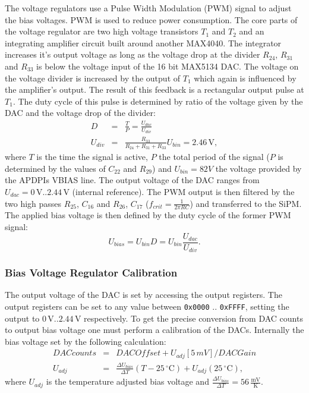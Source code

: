 \documentclass[]{article}
\begin{document}
The voltage regulators use a Pulse Width Modulation (PWM) signal to adjust the bias voltages. PWM is used to reduce power consumption.
The core parts of the voltage regulator are two high voltage transistors $T_1$ and $T_2$ and an integrating amplifier circuit built around another MAX4040. The integrator increases
it's output voltage as long as the voltage drop at the divider $R_{24}$, $R_{31}$ and $R_{33}$ is below the voltage input of the 16 bit MAX5134 DAC.
The voltage on the voltage divider is increased by the output of $T_1$ which again is influenced by the amplifier's output. The result of this feedback is a rectangular output
pulse at $T_1$. The duty cycle of this pulse is determined by ratio of the voltage given by the DAC and the voltage drop of the divider:
	\begin{eqnarray}
		D &=& \frac{T}{P} = \frac{U_{dac}}{U_{div}} \\
		U_{div} &=& \frac{R_{33}}{R_{24} + R_{31} + R_{33}} U_{bin} = 2.46\,\text{V},
	\end{eqnarray}
where $T$ is the time the signal is active, $P$ the total period of the signal ($P$ is determined by the values of $C_{22}$ and $R_{29}$) and $U_{bin}=82V$ the voltage provided by the 
APDPIs VBIAS line. The output voltage of the DAC ranges from $U_{dac}=0\, \text{V} .. 2.44\, \text{V}$ (internal reference). The PWM output is then filtered by the two high passes 
$R_{25}$, $C_{16}$ and $R_{26}$, $C_{17}$ ($f_{crit} = \frac{1}{2 \pi RC}$) and transferred to the SiPM. The applied bias voltage is then defined by the duty cycle of the former 
PWM signal:
	\begin{equation}
		U_{bias} = U_{bin} D = U_{bin} \frac{U_{dac}}{U_{div}}.
	\end{equation}

\subsubsection{Bias Voltage Regulator Calibration}
The output voltage of the DAC is set by accessing the output registers. The output registers can be set to any value between \verb|0x0000| .. \verb|0xFFFF|, setting the output to 
$0\, \text{V}..2.44\, \text{V}$ respectively. To get the precise conversion from DAC counts to output bias voltage one must perform a calibration of the DACs. Internally 
the bias voltage set by the following calculation:
	\begin{eqnarray}
		DACcounts &=& DACOffset + U_{adj}[5\,mV]/DACGain \\
		U_{adj} &=& \frac{\Delta U_{bias}}{\Delta T}(T - 25\,^{\circ} \text{C}) + U_{adj}(25\,^{\circ} \text{C}),
	\end{eqnarray} 
where $U_{adj}$ is the temperature adjusted bias voltage and $\frac{\Delta U_{bias}}{\Delta T} = 56\,\frac{\text{mV}}{\text{K}}$. 
\end{document}
